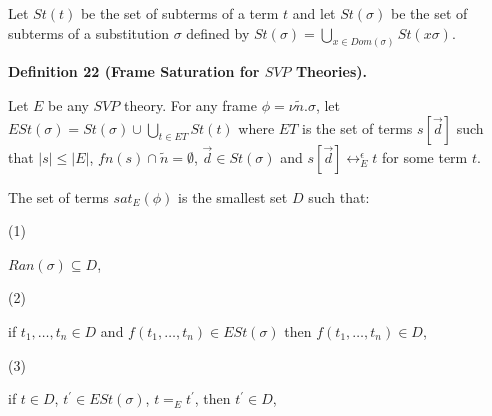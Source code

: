  
 
Let $St(t)$ be the set of subterms of a term $t$ and let $St(\sigma)$ be the set of subterms of a substitution $\sigma$ defined by $St(\sigma)=\bigcup_{x\in Dom(\sigma)}St(x\sigma)$.\par
 
 
 
\par\medskip\noindent\textbf{Definition 22 (Frame Saturation for $\mathit{SVP}$ Theories).}\par
 
 
Let $E$ be any $\mathit{SVP}$ theory. For any frame $\phi=\nu\tilde{n}.\sigma$, let $ESt(\sigma)=St(\sigma)\cup\bigcup_{t\in ET}St(t)$ where $ET$ is the set of terms $s[\vec{d}]$ such that $|s|\leq|E|$, $fn(s)\cap\tilde{n}=\emptyset$, $\vec{d}\in St(\sigma)$ and $s[\vec{d}]\leftrightarrow_{E}^{\epsilon}t$ for some term $t$.\par
 
 
 
The set of terms $sat_{E}(\phi)$ is the smallest set $D$ such that:\par
  
\par\noindent  (1) 
 
$Ran(\sigma)\subseteq D$,\par
 
 
 
\par\noindent  (2) 
 
if $t_{1},\dots,t_{n}\in D$ and $f(t_{1},\dots,t_{n})\in ESt(\sigma)$ then $f(t_{1},\dots,t_{n})\in D$,\par
 
 
 
\par\noindent  (3) 
 
if $t\in D$, $t^{\prime}\in ESt(\sigma)$, $t=_{E}t^{\prime}$, then $t^{\prime}\in D$,\par
 
 
  
 
 

